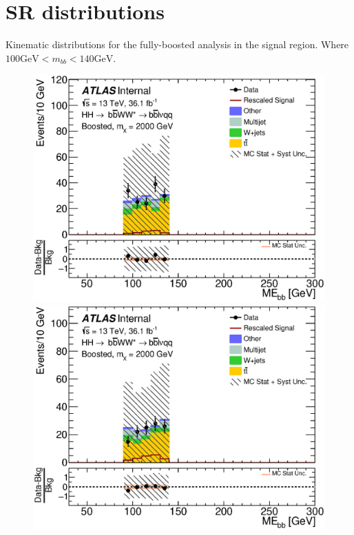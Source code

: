 \chapter{SR distributions}
\label{app:sr_john}
Kinematic distributions for the fully-boosted analysis in the signal region. Where ${100 \mathrm{GeV} < m_{bb} < 140 \mathrm{GeV}}$.
\begin{figure}[h]
\begin{center}
\includegraphics[scale=0.33]{figures/kinplots/new/C_2tag_SR_elec_presel_met50_HbbMass}
\includegraphics[scale=0.33]{figures/kinplots/new/C_2tag_SR_muon_presel_met50_HbbMass}\\

\end{center}
\end{figure}
